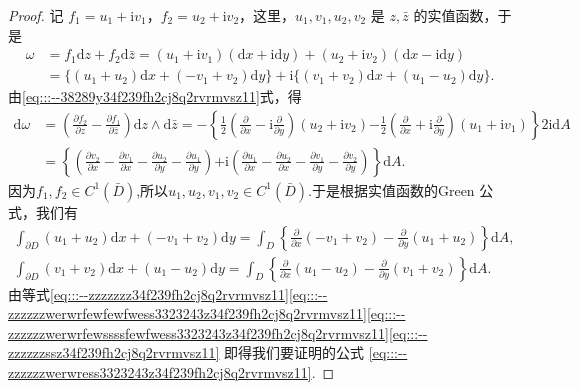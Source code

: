 \documentclass[../../main.tex]{subfiles}%
\begin{document}
\begin{proof}

记 \( f_1 = u_1 + \mathrm{i}v_1 \)，\( f_2 = u_2 + \mathrm{i}v_2 \)，这里，\( u_1,v_1,u_2,v_2 \) 是 \( z,\bar{z} \) 的实值函数，于是
\begin{align}\label{eq:::--zzzzzzz34f239fh2cj8q2rvrmvsz11}
\omega &= f_1 \mathrm{d}z + f_2 \mathrm{d}\bar{z} = (u_1 + \mathrm{i}v_1)(\mathrm{d}x + \mathrm{i}\mathrm{d}y) + (u_2 + \mathrm{i}v_2)(\mathrm{d}x - \mathrm{i}\mathrm{d}y) \nonumber \\
&= \{(u_1 + u_2)\mathrm{d}x + (-v_1 + v_2)\mathrm{d}y\}+ \mathrm{i}\{(v_1 + v_2)\mathrm{d}x + (u_1 - u_2)\mathrm{d}y\}.
\end{align}
由\eqref{eq:::--38289y34f239fh2cj8q2rvrmvsz11}式，得
\begin{align}
\mathrm{d}\omega &= \left( \frac{\partial f_2}{\partial z} - \frac{\partial f_1}{\partial \bar{z}} \right) \mathrm{d}z \wedge \mathrm{d}\bar{z} = -\left\{ \frac{1}{2} \left( \frac{\partial}{\partial x} - \mathrm{i} \frac{\partial}{\partial y} \right)(u_2 + \mathrm{i}v_2) \right. \left. - \frac{1}{2} \left( \frac{\partial}{\partial x} + \mathrm{i} \frac{\partial}{\partial y} \right)(u_1 + \mathrm{i}v_1) \right\} 2\mathrm{i}\mathrm{d}A \nonumber \\
&= \left\{ \left( \frac{\partial v_2}{\partial x} - \frac{\partial v_1}{\partial x} - \frac{\partial u_2}{\partial y} - \frac{\partial u_1}{\partial y} \right) \right. \left. + \mathrm{i} \left( \frac{\partial u_1}{\partial x} - \frac{\partial u_2}{\partial x} - \frac{\partial v_1}{\partial y} - \frac{\partial v_2}{\partial y} \right) \right\} \mathrm{d}A. \label{eq:::--zzzzzzwerwrfewfewfwess3323243z34f239fh2cj8q2rvrmvsz11}
\end{align}
因为\( f_1,f_2 \in C^1(\bar{D}) \),所以$u_1,u_2,v_1,v_2\in C^1(\bar{D})$.于是根据实值函数的Green 公式，我们有
\begin{gather}
\int_{\partial D} (u_1 + u_2)\mathrm{d}x + (-v_1 + v_2)\mathrm{d}y = \int_D \left\{ \frac{\partial}{\partial x}(-v_1 + v_2) - \frac{\partial}{\partial y}(u_1 + u_2) \right\} \mathrm{d}A, \label{eq:::--zzzzzzwerwrfewssssfewfwess3323243z34f239fh2cj8q2rvrmvsz11}
\\
\int_{\partial D} (v_1 + v_2)\mathrm{d}x + (u_1 - u_2)\mathrm{d}y = \int_D \left\{ \frac{\partial}{\partial x}(u_1 - u_2) - \frac{\partial}{\partial y}(v_1 + v_2) \right\} \mathrm{d}A. \label{eq:::--zzzzzzssz34f239fh2cj8q2rvrmvsz11}
\end{gather}
由等式\eqref{eq:::--zzzzzzz34f239fh2cj8q2rvrmvsz11}\eqref{eq:::--zzzzzzwerwrfewfewfwess3323243z34f239fh2cj8q2rvrmvsz11}\eqref{eq:::--zzzzzzwerwrfewssssfewfwess3323243z34f239fh2cj8q2rvrmvsz11}\eqref{eq:::--zzzzzzssz34f239fh2cj8q2rvrmvsz11} 即得我们要证明的公式 \eqref{eq:::--zzzzzzwerwress3323243z34f239fh2cj8q2rvrmvsz11}.

\end{proof}
\end{document}
